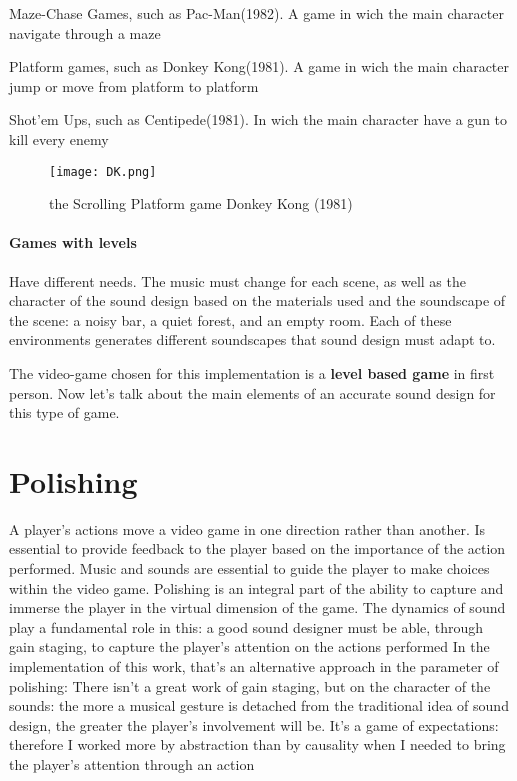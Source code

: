 		\begin{compactitem}
			\item Maze-Chase Games, such as Pac-Man(1982). A game in wich the main character navigate through a maze
			\item Platform games, such as Donkey Kong(1981). A game in wich the main character jump or move from platform to platform
			\item Shot'em Ups, such as Centipede(1981). In wich the main character have a gun to kill every enemy
		\end{compactitem}

	\begin{figure}[h]
		\begin{center}
			\texttt{[image: DK.png]}
			\caption{the Scrolling Platform game Donkey Kong (1981)}
		\end{center}
	\end{figure}

	\paragraph{Games with levels} Have different needs. The music must change for each scene, as well as the character of the sound design based on the materials used and the soundscape of the scene: a noisy bar, a quiet forest, and an empty room. Each of these environments generates different soundscapes that sound design must adapt to.

The video-game chosen for this implementation is a \textbf{level based game} in first person. Now let's talk about the main elements of an accurate sound design for this type of game.

\section{Polishing}

A player's actions move a video game in one direction rather than another. Is essential to provide feedback to the player based on the importance of the action performed. Music and sounds are essential to guide the player to make choices within the video game. Polishing is an integral part of the ability to capture and immerse the player in the virtual dimension of the game. The dynamics of sound play a fundamental role in this: a good sound designer must be able, through gain staging, to capture the player's attention on the actions performed
In the implementation of this work, that's an alternative approach in the parameter of polishing: There isn't a great work of gain staging, but on the character of the sounds: the more a musical gesture is detached from the traditional idea of ​​sound design, the greater the player's involvement will be. It's a game of expectations: therefore I worked more by abstraction than by causality when I needed to bring the player's attention through an action

